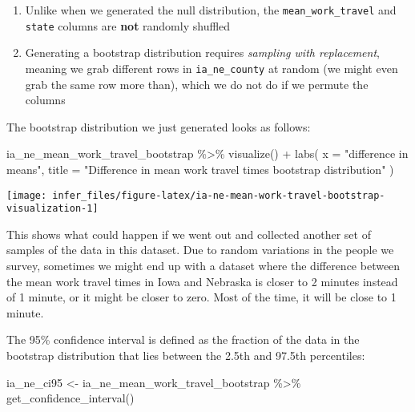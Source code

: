 \documentclass[
]{book}
\newenvironment{Shaded}{\begin{snugshade}}{\end{snugshade}}
\newcommand{\AttributeTok}[1]{\textcolor[rgb]{0.77,0.63,0.00}{#1}}
\newcommand{\FunctionTok}[1]{\textcolor[rgb]{0.00,0.00,0.00}{#1}}
\newcommand{\NormalTok}[1]{#1}
\newcommand{\OtherTok}[1]{\textcolor[rgb]{0.56,0.35,0.01}{#1}}
\newcommand{\SpecialCharTok}[1]{\textcolor[rgb]{0.00,0.00,0.00}{#1}}
\newcommand{\StringTok}[1]{\textcolor[rgb]{0.31,0.60,0.02}{#1}}
\begin{document}
\begin{enumerate}
\def\labelenumi{\arabic{enumi}.}
\item
  Unlike when we generated the null distribution, the \texttt{mean\_work\_travel} and \texttt{state} columns are \textbf{not} randomly shuffled
\item
  Generating a bootstrap distribution requires \emph{sampling with replacement}, meaning we grab different rows in \texttt{ia\_ne\_county} at random (we might even grab the same row more than), which we do not do if we permute the columns
\end{enumerate}

The bootstrap distribution we just generated looks as follows:

\begin{Shaded}
\begin{Highlighting}[]
\NormalTok{ia\_ne\_mean\_work\_travel\_bootstrap }\SpecialCharTok{\%\textgreater{}\%}
  \FunctionTok{visualize}\NormalTok{() }\SpecialCharTok{+}
  \FunctionTok{labs}\NormalTok{(}
    \AttributeTok{x =} \StringTok{"difference in means"}\NormalTok{,}
    \AttributeTok{title =} \StringTok{"Difference in mean work travel times bootstrap distribution"}
\NormalTok{  )}
\end{Highlighting}
\end{Shaded}

\begin{center}\texttt{[image: infer\_files/figure-latex/ia-ne-mean-work-travel-bootstrap-visualization-1]} \end{center}

This shows what could happen if we went out and collected another set of samples of the data in this dataset.
Due to random variations in the people we survey, sometimes we might end up with a dataset where the difference between the mean work travel times in Iowa and Nebraska is closer to 2 minutes instead of 1 minute, or it might be closer to zero.
Most of the time, it will be close to 1 minute.

The 95\% confidence interval is defined as the fraction of the data in the bootstrap distribution that lies between the 2.5th and 97.5th percentiles:

\begin{Shaded}
\begin{Highlighting}[]
\NormalTok{ia\_ne\_ci95 }\OtherTok{\textless{}{-}}\NormalTok{ ia\_ne\_mean\_work\_travel\_bootstrap }\SpecialCharTok{\%\textgreater{}\%}
  \FunctionTok{get\_confidence\_interval}\NormalTok{()}
\end{Highlighting}
\end{Shaded}
\end{document}
